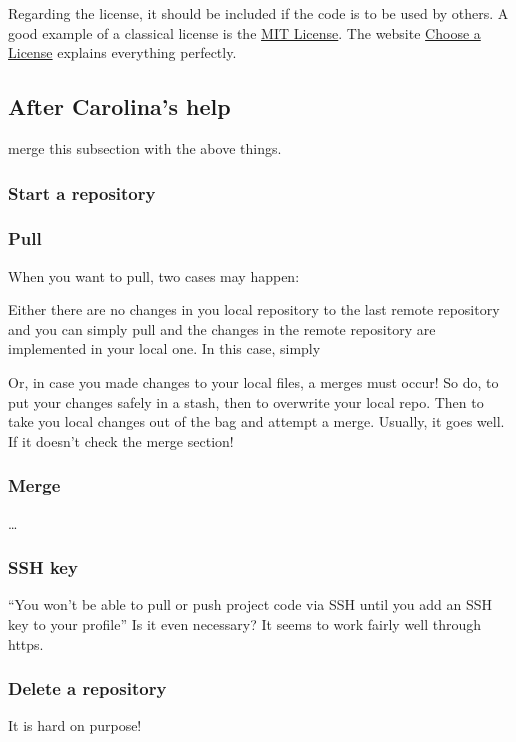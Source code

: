 \par Regarding the license, it should be included if the code is to be used by others. A good example of a classical license is the \href{https://choosealicense.com/licenses/mit/}{MIT License}. The website \href{https://choosealicense.com}{Choose a License} explains everything perfectly.


\subsection{After Carolina's help}
merge this subsection with the above things.

\subsubsection{Start a repository}



\subsubsection{Pull}
When you want to pull, two cases may happen: 

Either there are no changes in you local repository to the last remote repository and you can simply pull and the changes in the remote repository are implemented in your local one. In this case, simply 

Or, in case you made changes to your local files, a merges must occur!
So do,  to put your changes safely in a stash, then  to overwrite your local repo. Then  to take you local changes out of the bag and attempt a merge. Usually, it goes well. If it doesn't check the merge section!

\subsubsection{Merge}
\dots

\subsubsection{SSH key}
``You won't be able to pull or push project code via SSH until you add an SSH key to your profile''
Is it even necessary? It seems to work fairly well through https.


\subsubsection{Delete a repository}
It is hard on purpose! 

